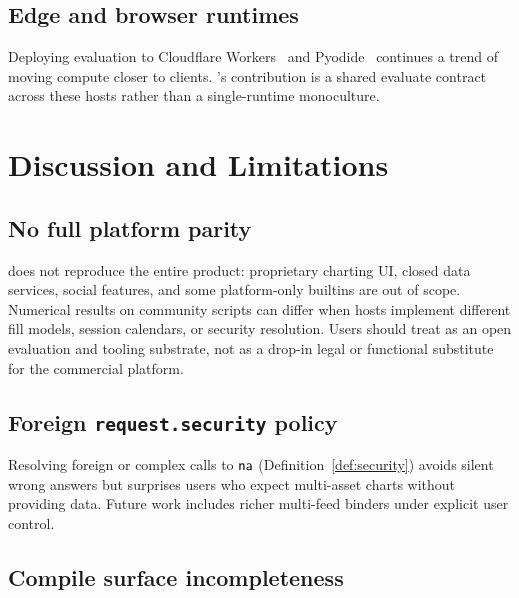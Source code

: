 \documentclass[11pt,a4paper]{article}
\begin{document}
\subsection{Edge and browser runtimes}
\label{sec:rw-edge}

Deploying evaluation to Cloudflare Workers~\citep{cloudflare-workers} and
Pyodide~\citep{pyodide} continues a trend of moving compute closer to clients.
\pyne{}'s contribution is a shared evaluate contract across these hosts rather
than a single-runtime monoculture.

\section{Discussion and Limitations}
\label{sec:discussion}

\subsection{No full platform parity}
\label{sec:lim-parity}

\pyne{} does not reproduce the entire \tv{} product: proprietary charting UI,
closed data services, social features, and some platform-only builtins are out
of scope.
Numerical results on community scripts can differ when hosts implement
different fill models, session calendars, or security resolution.
Users should treat \pyne{} as an open evaluation and tooling substrate, not as
a drop-in legal or functional substitute for the commercial platform.

\subsection{Foreign \texttt{request.security} policy}
\label{sec:lim-security}

Resolving foreign or complex  calls to $\textsf{na}$
(Definition~\ref{def:security}) avoids silent wrong answers but surprises users
who expect multi-asset charts without providing data.
Future work includes richer multi-feed binders under explicit user control.

\subsection{Compile surface incompleteness}
\label{sec:lim-compile}
\end{document}
